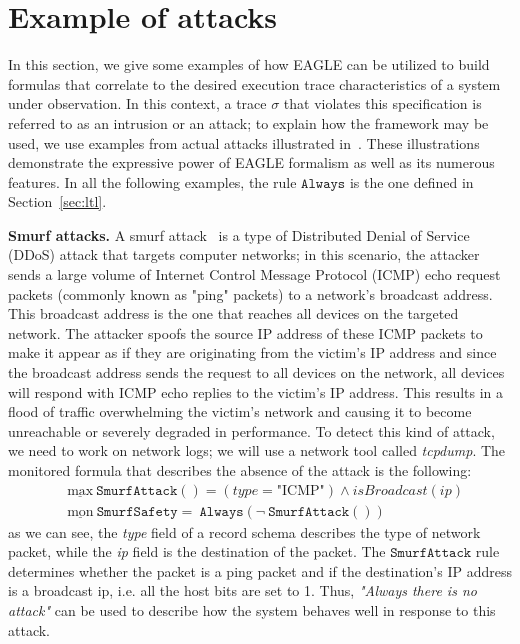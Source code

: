 \documentclass[english]{article}
\begin{document}
\section{Example of attacks}\label{attacks}
In this section, we give some examples of how EAGLE can be utilized to build formulas that correlate to the desired execution trace characteristics of a system under observation. In this context, a trace $\sigma$ that violates this specification is referred to as an intrusion or an attack; to explain how the framework may be used, we use examples from actual attacks illustrated in~\cite{naldurg2004temporal}. These illustrations demonstrate the expressive power of EAGLE formalism as well as its numerous features. In all the following examples, the rule $\mathtt{Always}$ is the one defined in Section~\ref{sec:ltl}.

\textbf{Smurf attacks.}
A smurf attack~\cite{zargar2009identification} is a type of Distributed Denial of Service (DDoS) attack that targets computer networks; in this scenario, the attacker sends a large volume of Internet Control Message Protocol (ICMP) echo request packets (commonly known as "ping" packets) to a network's broadcast address. This broadcast address is the one that reaches all devices on the targeted network. The attacker spoofs the source IP address of these ICMP packets to make it appear as if they are originating from the victim's IP address and since the broadcast address sends the request to all devices on the network, all devices will respond with ICMP echo replies to the victim's IP address. This results in a flood of traffic overwhelming the victim's network and causing it to become unreachable or severely degraded in performance. To detect this kind of attack, we need to work on network logs; we will use a network tool called \textit{tcpdump}. The monitored formula that describes the absence of the attack is the following:
\begin{align*}
    & \underline{\text{max}}\ \mathtt{SmurfAttack()} = (type = \text{"ICMP"})\land isBroadcast(ip) \\
    & \underline{\text{mon}}\ \mathtt{SmurfSafety} =\ \mathtt{Always}(\neg\ \mathtt{SmurfAttack()}) 
\end{align*}
as we can see, the \textit{type} field of a record schema describes the type of network packet, while the \textit{ip} field is the destination of the packet. The $\mathtt{SmurfAttack}$ rule determines whether the packet is a ping packet and if the destination's IP address is a broadcast ip, i.e. all the host bits are set to 1. Thus, \textit{"Always there is no attack"} can be used to describe how the system behaves well in response to this attack.
\end{document}
